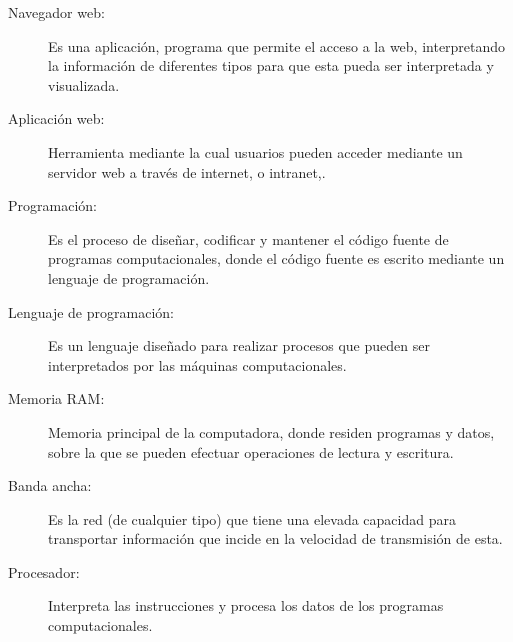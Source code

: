 \begin{description}
	\item [Navegador web:]  Es una aplicación, programa que permite el acceso a la web, interpretando la información de diferentes tipos para que esta pueda ser interpretada y visualizada.

	\item [Aplicación web:]Herramienta mediante la cual usuarios pueden acceder mediante un servidor web a través de internet, o intranet,.
	
 	\item [Programación:]Es el proceso de diseñar, codificar y mantener el código fuente de programas computacionales, donde el código fuente es escrito mediante un lenguaje de programación.
 	
 	\item [Lenguaje de programación:]Es un lenguaje diseñado para realizar procesos que pueden ser interpretados por las máquinas computacionales.
 	
 	\item [Memoria RAM:]Memoria principal de la computadora, donde residen programas y datos, sobre la que se pueden efectuar operaciones de lectura y escritura.
 	
 	\item [Banda ancha:]Es la red (de cualquier tipo) que tiene una elevada capacidad para transportar información que incide en la velocidad de transmisión de esta.
 	
 	\item [Procesador:]Interpreta las instrucciones y procesa los datos de los programas computacionales.
\end{description}
